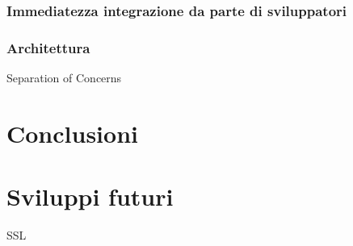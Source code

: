 \documentclass[12pt,a4paper,openright,twoside]{report}
\begin{document}
\subsection{Immediatezza integrazione da parte di sviluppatori}

\subsection{Architettura}
Separation of Concerns

\clearpage{\pagestyle{empty}\cleardoublepage}
\chapter*{Conclusioni}

\chapter{Sviluppi futuri}
SSL
\clearpage{\pagestyle{empty}\cleardoublepage}




\end{document}

